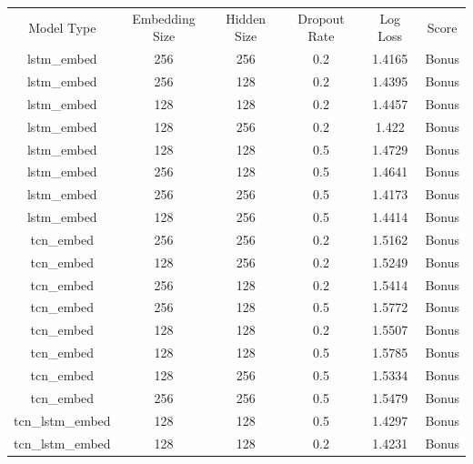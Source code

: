 \documentclass[12pt]{article}
\begin{document}
\begin{longtable}[c]{@{}>{\ttfamily}cccccc@{}}
	\toprule
	\textrm{Model Type}  & Embedding Size & Hidden Size & Dropout Rate & Log Loss & Score \\*\midrule
	\endhead
	\bottomrule
	\endfoot
	\endlastfoot
	lstm\_embed          & 256            & 256         & 0.2          & 1.4165   & Bonus \\
	lstm\_embed          & 256            & 128         & 0.2          & 1.4395   & Bonus \\
	lstm\_embed          & 128            & 128         & 0.2          & 1.4457   & Bonus \\
	lstm\_embed          & 128            & 256         & 0.2          & 1.422    & Bonus \\
	lstm\_embed          & 128            & 128         & 0.5          & 1.4729   & Bonus \\
	lstm\_embed          & 256            & 128         & 0.5          & 1.4641   & Bonus \\
	lstm\_embed          & 256            & 256         & 0.5          & 1.4173   & Bonus \\
	lstm\_embed          & 128            & 256         & 0.5          & 1.4414   & Bonus \\\midrule
	tcn\_embed           & 256            & 256         & 0.2          & 1.5162   & Bonus \\
	tcn\_embed           & 128            & 256         & 0.2          & 1.5249   & Bonus \\
	tcn\_embed           & 256            & 128         & 0.2          & 1.5414   & Bonus \\
	tcn\_embed           & 256            & 128         & 0.5          & 1.5772   & Bonus \\
	tcn\_embed           & 128            & 128         & 0.2          & 1.5507   & Bonus \\
	tcn\_embed           & 128            & 128         & 0.5          & 1.5785   & Bonus \\
	tcn\_embed           & 128            & 256         & 0.5          & 1.5334   & Bonus \\
	tcn\_embed           & 256            & 256         & 0.5          & 1.5479   & Bonus \\\midrule
	tcn\_lstm\_embed     & 128            & 128         & 0.5          & 1.4297   & Bonus \\
	tcn\_lstm\_embed     & 128            & 128         & 0.2          & 1.4231   & Bonus \\

\end{longtable}
\end{document}
